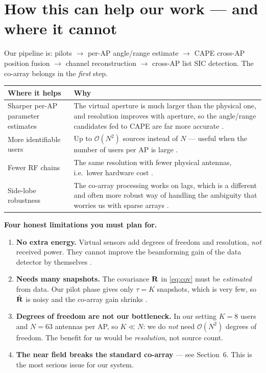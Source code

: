 \documentclass[11pt]{article}
\begin{document}
\section{How this can help our work --- and where it cannot}

Our pipeline is: pilots $\rightarrow$ per-AP angle/range estimate $\rightarrow$ CAPE cross-AP position
fusion $\rightarrow$ channel reconstruction $\rightarrow$ cross-AP list SIC detection. The co-array
belongs in the \emph{first} step.

\begin{center}
\renewcommand{\arraystretch}{1.2}
\begin{tabular}{@{}p{5.1cm}p{9.5cm}@{}}
\toprule
\textbf{Where it helps} & \textbf{Why}\\
\midrule
Sharper per-AP parameter estimates & The virtual aperture is much larger than the physical one, and
resolution improves with aperture, so the angle/range candidates fed to CAPE are far more accurate
\cite{pal2010nested}.\\
More identifiable users & Up to $\mathcal{O}(N^{2})$ sources instead of $N$ --- useful when the
number of users per AP is large \cite{pal2010nested,vaidyanathan2011coprime}.\\
Fewer RF chains & The same resolution with fewer physical antennas, i.e.\ lower hardware cost
\cite{pinto2023sra}.\\
Side-lobe robustness & The co-array processing works on lags, which is a different and often more
robust way of handling the ambiguity that worries us with sparse arrays \cite{liu2015remarks}.\\
\bottomrule
\end{tabular}
\end{center}

\begin{warnbox}
\textbf{Four honest limitations you must plan for.}
\begin{enumerate}[leftmargin=1.5em,itemsep=1pt]
\item \textbf{No extra energy.} Virtual sensors add degrees of freedom and resolution, \emph{not}
      received power. They cannot improve the beamforming gain of the data detector by themselves
      \cite{pal2010nested}.
\item \textbf{Needs many snapshots.} The covariance $\mathbf{R}$ in \eqref{eq:cov} must be \emph{estimated}
      from data. Our pilot phase gives only $\tau=K$ snapshots, which is very few, so
      $\hat{\mathbf{R}}$ is noisy and the co-array gain shrinks \cite{liu2015remarks}.
\item \textbf{Degrees of freedom are not our bottleneck.} In our setting $K=8$ users and $N=63$
      antennas per AP, so $K\ll N$: we do \emph{not} need $\mathcal{O}(N^{2})$ degrees of freedom.
      The benefit for us would be \emph{resolution}, not source count.
\item \textbf{The near field breaks the standard co-array} --- see Section~6. This is the most
      serious issue for our system.
\end{enumerate}
\end{warnbox}
\end{document}
